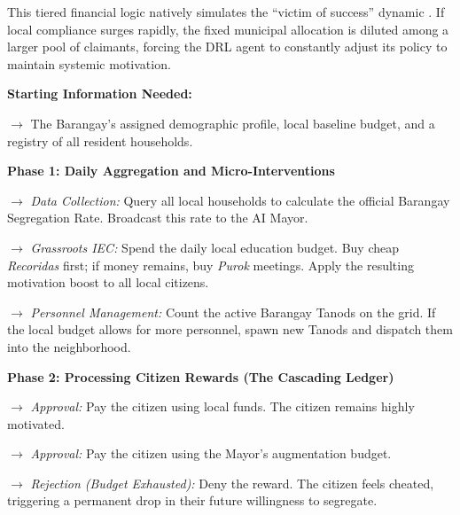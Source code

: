 This tiered financial logic natively simulates the ``victim of success'' dynamic \citep{WorldBank2022}. If local compliance surges rapidly, the fixed municipal allocation is diluted among a larger pool of claimants, forcing the DRL agent to constantly adjust its policy to maintain systemic motivation.

\vspace{0.5cm} 
\begin{algorithm}[H]
\caption{The Barangay's Administrative and Fiscal Loop}
\label{alg:barangay_execution_english}
\begin{algorithmic}[1]
\State \textbf{Starting Information Needed:} 
\State \parbox[t]{0.9\linewidth}{$\rightarrow$ The Barangay's assigned demographic profile, local baseline budget, and a registry of all resident households.\strut}
\Statex
\State \textbf{Phase 1: Daily Aggregation and Micro-Interventions}
\State \parbox[t]{0.9\linewidth}{$\rightarrow$ \textit{Data Collection:} Query all local households to calculate the official Barangay Segregation Rate. Broadcast this rate to the AI Mayor.\strut}
\State \parbox[t]{0.9\linewidth}{$\rightarrow$ \textit{Grassroots IEC:} Spend the daily local education budget. Buy cheap \textit{Recoridas} first; if money remains, buy \textit{Purok} meetings. Apply the resulting motivation boost to all local citizens.\strut}
\State \parbox[t]{0.9\linewidth}{$\rightarrow$ \textit{Personnel Management:} Count the active Barangay Tanods on the grid. If the local budget allows for more personnel, spawn new Tanods and dispatch them into the neighborhood.\strut}
\Statex
\State \textbf{Phase 2: Processing Citizen Rewards (The Cascading Ledger)}
        \State \parbox[t]{0.85\linewidth}{$\rightarrow$ \textit{Approval:} Pay the citizen using local funds. The citizen remains highly motivated.\strut}
        \State \parbox[t]{0.85\linewidth}{$\rightarrow$ \textit{Approval:} Pay the citizen using the Mayor's augmentation budget.\strut}
    \Else
        \State \parbox[t]{0.85\linewidth}{$\rightarrow$ \textit{Rejection (Budget Exhausted):} Deny the reward. The citizen feels cheated, triggering a permanent drop in their future willingness to segregate.\strut}
    \EndIf
\EndIf
\end{algorithmic}
\end{algorithm}
